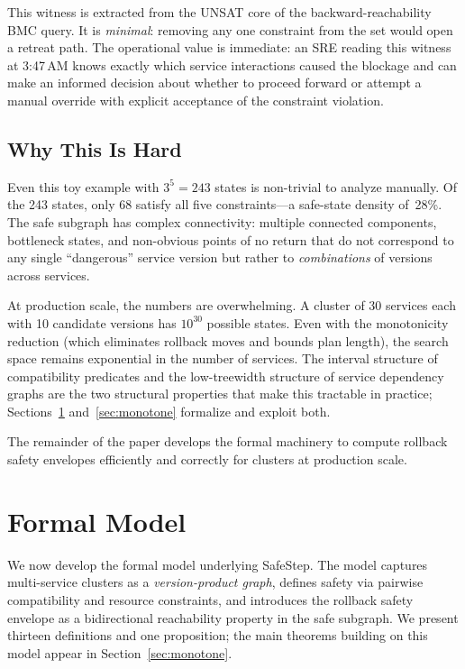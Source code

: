 \documentclass[10pt,twocolumn]{article}
\begin{document}
\noindent
This witness is extracted from the UNSAT core of the backward-reachability
BMC query.  It is \emph{minimal}: removing any one constraint from the set
would open a retreat path.  The operational value is immediate: an SRE
reading this witness at 3:47\,AM knows exactly which service interactions
caused the blockage and can make an informed decision about whether to
proceed forward or attempt a manual override with explicit acceptance of
the constraint violation.

\subsection{Why This Is Hard}
\label{sec:motivation:hard}

Even this toy example with $3^5 = 243$ states is non-trivial to analyze
manually.  Of the 243 states, only 68 satisfy all five constraints---a
safe-state density of~28\%.  The safe subgraph has complex connectivity:
multiple connected components, bottleneck states, and non-obvious points of
no return that do not correspond to any single ``dangerous'' service
version but rather to \emph{combinations} of versions across services.

At production scale, the numbers are overwhelming.  A cluster of 30
services each with 10 candidate versions has $10^{30}$ possible states.
Even with the monotonicity reduction (which eliminates rollback moves and
bounds plan length), the search space remains exponential in the number of
services.  The interval structure of compatibility predicates and the
low-treewidth structure of service dependency graphs are the two structural
properties that make this tractable in practice; Sections~\ref{sec:formal}
and~\ref{sec:monotone} formalize and exploit both.

\medskip
\noindent
The remainder of the paper develops the formal machinery to compute
rollback safety envelopes efficiently and correctly for clusters at
production scale.


\section{Formal Model}
\label{sec:formal}

We now develop the formal model underlying SafeStep.  The model captures
multi-service clusters as a \emph{version-product graph}, defines safety
via pairwise compatibility and resource constraints, and introduces the
rollback safety envelope as a bidirectional reachability property in the
safe subgraph.  We present thirteen definitions and one proposition; the
main theorems building on this model appear in
Section~\ref{sec:monotone}.
\end{document}
